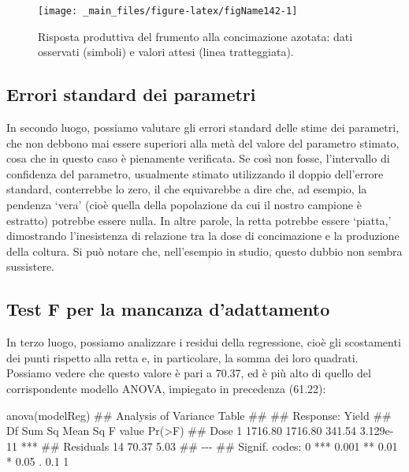 \documentclass[a4paper,12pt,oneside]{book}
\newenvironment{Shaded}{\begin{snugshade}}{\end{snugshade}}
\newcommand{\DocumentationTok}[1]{#1}
\newcommand{\FunctionTok}[1]{#1}
\newcommand{\NormalTok}[1]{#1}
\begin{document}
\begin{figure}

{\centering \texttt{[image: \_main\_files/figure-latex/figName142-1]} 

}

\caption{Risposta produttiva del frumento alla concimazione azotata: dati osservati (simboli) e valori attesi (linea tratteggiata).}\label{fig:figName142}
\end{figure}

\hypertarget{errori-standard-dei-parametri}{%
\subsection{Errori standard dei parametri}\label{errori-standard-dei-parametri}}

In secondo luogo, possiamo valutare gli errori standard delle stime dei parametri, che non debbono mai essere superiori alla metà del valore del parametro stimato, cosa che in questo caso è pienamente verificata. Se così non fosse, l'intervallo di confidenza del parametro, usualmente stimato utilizzando il doppio dell'errore standard, conterrebbe lo zero, il che equivarebbe a dire che, ad esempio, la pendenza `vera' (cioè quella della popolazione da cui il nostro campione è estratto) potrebbe essere nulla. In altre parole, la retta potrebbe essere `piatta,' dimostrando l'inesistenza di relazione tra la dose di concimazione e la produzione della coltura. Si può notare che, nell'esempio in studio, questo dubbio non sembra sussistere.

\hypertarget{test-f-per-la-mancanza-dadattamento}{%
\subsection{Test F per la mancanza d'adattamento}\label{test-f-per-la-mancanza-dadattamento}}

In terzo luogo, possiamo analizzare i residui della regressione, cioè gli scostamenti dei punti rispetto alla retta e, in particolare, la somma dei loro quadrati. Possiamo vedere che questo valore è pari a 70.37, ed è più alto di quello del corrispondente modello ANOVA, impiegato in precedenza (61.22):

\begin{Shaded}
\begin{Highlighting}[]
\FunctionTok{anova}\NormalTok{(modelReg)}
\DocumentationTok{\#\# Analysis of Variance Table}
\DocumentationTok{\#\# }
\DocumentationTok{\#\# Response: Yield}
\DocumentationTok{\#\#           Df  Sum Sq Mean Sq F value    Pr(\textgreater{}F)    }
\DocumentationTok{\#\# Dose       1 1716.80 1716.80  341.54 3.129e{-}11 ***}
\DocumentationTok{\#\# Residuals 14   70.37    5.03                      }
\DocumentationTok{\#\# {-}{-}{-}}
\DocumentationTok{\#\# Signif. codes:  0 \textquotesingle{}***\textquotesingle{} 0.001 \textquotesingle{}**\textquotesingle{} 0.01 \textquotesingle{}*\textquotesingle{} 0.05 \textquotesingle{}.\textquotesingle{} 0.1 \textquotesingle{} \textquotesingle{} 1}
\end{Highlighting}
\end{Shaded}
\end{document}
